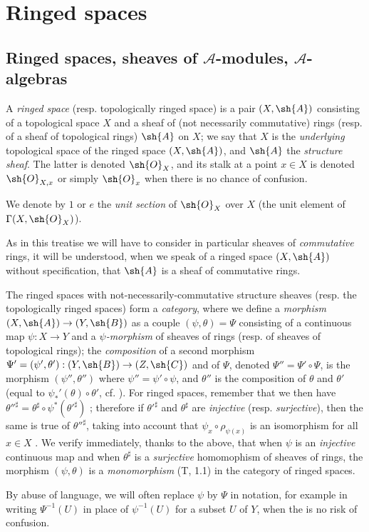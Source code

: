 \section{Ringed spaces}
\label{section:0.4}

\subsection{Ringed spaces, sheaves of $\mathcal{A}$-modules, $\mathcal{A}$-algebras}
\label{subsection:0.4.1}

\begin{env}[4.1.1]
\label{0.4.1.1}
A \emph{ringed space} (resp. topologically ringed space) is a pair $(X,\sh{A})$
consisting of a topological space $X$ and a sheaf of (not necessarily
commutative) rings (resp. of a sheaf of topological rings) $\sh{A}$ on $X$; we
say that $X$ is the \emph{underlying} topological space of the ringed space
$(X,\sh{A})$, and $\sh{A}$ the \emph{structure sheaf}. The latter is denoted
$\sh{O}_X$, and its stalk at a point $x\in X$ is denoted $\sh{O}_{X,x}$ or simply
$\sh{O}_x$ when there is no chance of confusion.

We denote by $1$ or $e$ the \emph{unit section} of $\sh{O}_X$ over $X$ (the unit
element of $\Gamma(X,\sh{O}_X)$).

As in this treatise we will have to consider in particular sheaves of
\emph{commutative} rings, it will be understood, when we speak of a ringed space
$(X,\sh{A})$ without specification, that $\sh{A}$ is a sheaf of commutative
rings.

The ringed spaces with not-necessarily-commutative structure sheaves
(resp. the topologically ringed spaces) form a \emph{category}, where we define
a \emph{morphism} $(X,\sh{A})\to(Y,\sh{B})$ as a couple $(\psi,\theta)=\Psi$
consisting of a continuous map $\psi:X\to Y$ and a \emph{$\psi$-morphism}
  of sheaves of rings (resp. of sheaves
of topological rings); the \emph{composition} of a second morphism
$\Psi'=(\psi',\theta'):(Y,\sh{B})\to(Z,\sh{C})$ and of $\Psi$, denoted
$\Psi''=\Psi'\circ\Psi$, is the morphism $(\psi'',\theta'')$ where
$\psi''=\psi'\circ\psi$, and $\theta''$ is the composition of $\theta$ and
$\theta'$ (equal to $\psi_*'(\theta)\circ\theta'$, cf. ). For
ringed spaces, remember that we then have
${\theta''}^\sharp=\theta^\sharp\circ\psi^*({\theta'}^\sharp)$
; therefore if ${\theta'}^\sharp$ and $\theta^\sharp$ are
\emph{injective} (resp. \emph{surjective}), then the same is true of
${\theta''}^\sharp$, taking into account that $\psi_x\circ\rho_{\psi(x)}$ is an
isomorphism for all $x\in X$ . We verify immediately, thanks to
the above, that when $\psi$ is an \emph{injective} continuous map and when
$\theta^\sharp$ is a \emph{surjective} homomophism of sheaves of rings, the
morphism $(\psi,\theta)$ is a \emph{monomorphism} (T, 1.1) in the category of
ringed spaces.

By abuse of language, we will often replace $\psi$ by $\Psi$ in notation, for
example in writing $\Psi^{-1}(U)$ in place of $\psi^{-1}(U)$ for a subset $U$ of
$Y$, when the is no risk of confusion.
\end{env}


